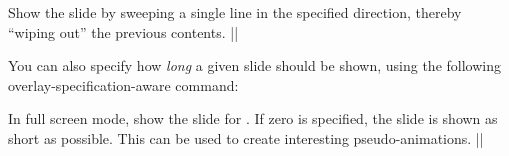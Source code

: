 \begin{command}{\transwipe{}}
  Show the slide by sweeping a single line in the specified direction, thereby ``wiping out'' the previous contents.
  \example|\transwipe[direction=90]|
\end{command}

You can also specify how \emph{long} a given slide should be shown, using the following overlay-specification-aware command:

\begin{command}{\transduration{}}
  In full screen mode, show the slide for . If zero is specified, the slide is shown as short as possible. This can be used to create interesting pseudo-animations.
  \example||
\end{command}

